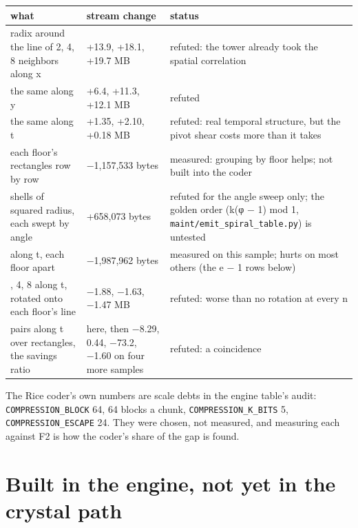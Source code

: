 {\small
\setlength{\tabcolsep}{6pt}
\begin{longtable}{>{\RaggedRight\arraybackslash}p{}>{\RaggedRight\arraybackslash}p{}>{\RaggedRight\arraybackslash}p{}}
\toprule
what & stream change & status \\
\midrule
\endhead
radix around the line of 2, 4, 8 neighbors along x & +13.9, +18.1, +19.7 MB & refuted: the tower already took the spatial correlation \\
the same along y & +6.4, +11.3, +12.1 MB & refuted \\
the same along t & +1.35, +2.10, +0.18 MB & refuted: real temporal structure, but the pivot shear costs more than it takes \\
each floor's rectangles row by row & −1,157,533 bytes & measured: grouping by floor helps; not built into the coder \\
shells of squared radius, each swept by angle & +658,073 bytes & refuted for the angle sweep only; the golden order (k(φ − 1) mod 1, \texttt{maint/\allowbreak{}emit\_\allowbreak{}spiral\_\allowbreak{}table.\allowbreak{}py}) is untested \\
2 along t, each floor apart & −1,987,962 bytes & measured on this sample; hurts on most others (the e − 1 rows below) \\
2, 4, 8 along t, rotated onto each floor's line & −1.88, −1.63, −1.47 MB & refuted: worse than no rotation at every n \\
pairs along t over rectangles, the savings ratio & 1.7174 here, then −8.29, 0.44, −73.2, −1.60 on four more samples & refuted: a coincidence \\
\bottomrule
\end{longtable}
}

The Rice coder's own numbers are scale debts in the engine table's audit: \texttt{COMPRESSION\_\allowbreak{}BLOCK} 64, 64 blocks a chunk, \texttt{COMPRESSION\_\allowbreak{}K\_\allowbreak{}BITS} 5, \texttt{COMPRESSION\_\allowbreak{}ESCAPE} 24. They were chosen, not measured, and measuring each against F2 is how the coder's share of the gap is found.

\section{\texorpdfstring{Built in the engine, not yet in the crystal path}{Built in the engine, not yet in the crystal path}}

